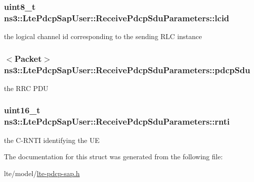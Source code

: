 \subsubsection[{\texorpdfstring{lcid}{lcid}}]{\setlength{\rightskip}{0pt plus 5cm}uint8\+\_\+t ns3\+::\+Lte\+Pdcp\+Sap\+User\+::\+Receive\+Pdcp\+Sdu\+Parameters\+::lcid}\hypertarget{structns3_1_1LtePdcpSapUser_1_1ReceivePdcpSduParameters_a5bcd8bf2e6b8ebcab6125cfa58a3786c}{}\label{structns3_1_1LtePdcpSapUser_1_1ReceivePdcpSduParameters_a5bcd8bf2e6b8ebcab6125cfa58a3786c}
the logical channel id corresponding to the sending R\+LC instance 
\subsubsection[{\texorpdfstring{pdcp\+Sdu}{pdcpSdu}}]{$<${\bf Packet}$>$ ns3\+::\+Lte\+Pdcp\+Sap\+User\+::\+Receive\+Pdcp\+Sdu\+Parameters\+::pdcp\+Sdu}\hypertarget{structns3_1_1LtePdcpSapUser_1_1ReceivePdcpSduParameters_a569439666ecffa68800c963caa7b3a30}{}\label{structns3_1_1LtePdcpSapUser_1_1ReceivePdcpSduParameters_a569439666ecffa68800c963caa7b3a30}
the R\+RC P\+DU 
\subsubsection[{\texorpdfstring{rnti}{rnti}}]{\setlength{\rightskip}{0pt plus 5cm}uint16\+\_\+t ns3\+::\+Lte\+Pdcp\+Sap\+User\+::\+Receive\+Pdcp\+Sdu\+Parameters\+::rnti}\hypertarget{structns3_1_1LtePdcpSapUser_1_1ReceivePdcpSduParameters_ad1b85c52209f38aae0fa3cc9c45ecabe}{}\label{structns3_1_1LtePdcpSapUser_1_1ReceivePdcpSduParameters_ad1b85c52209f38aae0fa3cc9c45ecabe}
the C-\/\+R\+N\+TI identifying the UE 

The documentation for this struct was generated from the following file\+:\begin{DoxyCompactItemize}
\item 
lte/model/\hyperlink{lte-pdcp-sap_8h}{lte-\/pdcp-\/sap.\+h}\end{DoxyCompactItemize}
